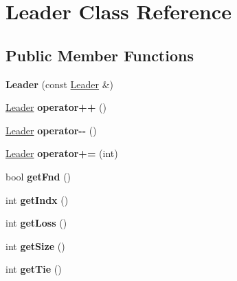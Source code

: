 \hypertarget{class_leader}{}\section{Leader Class Reference}
\label{class_leader}
\subsection*{Public Member Functions}
\begin{DoxyCompactItemize}
\item 
\mbox{\label{class_leader_a2c8110e3cd00c01c7c14118588e76cdf}} 
{\bfseries Leader} (const \mbox{\hyperlink{class_leader}{Leader}} \&)
\item 
\mbox{\label{class_leader_a35abe32ee61c1d6ba9636f74a6924c19}} 
\mbox{\hyperlink{class_leader}{Leader}} {\bfseries operator++} ()
\item 
\mbox{\label{class_leader_a7aa66b69cdd9d34e1efa1d6cfd0eb80b}} 
\mbox{\hyperlink{class_leader}{Leader}} {\bfseries operator-\/-\/} ()
\item 
\mbox{\label{class_leader_a439696cfd2101771afae1be8ad43b2a1}} 
\mbox{\hyperlink{class_leader}{Leader}} {\bfseries operator+=} (int)
\item 
\mbox{\label{class_leader_af09cfcf0b98c1fba9cc54171387419c8}} 
bool {\bfseries get\+Fnd} ()
\item 
\mbox{\label{class_leader_abada3ffaf354550d774bf774e01238ec}} 
int {\bfseries get\+Indx} ()
\item 
\mbox{\label{class_leader_ab1809c3e83a41fb5c61cae2d71863054}} 
int {\bfseries get\+Loss} ()
\item 
\mbox{\label{class_leader_a8799e32ecbb6af15cb9cc450ad82dff2}} 
int {\bfseries get\+Size} ()
\item 
\mbox{\label{class_leader_af170ccb3541091855c5d68f0d79a24b7}} 
int {\bfseries get\+Tie} ()
\item 
\mbox{\label{class_leader_afa04be568cbb6aac7170dbf6a65d351a}} 

\end{DoxyCompactItemize}
